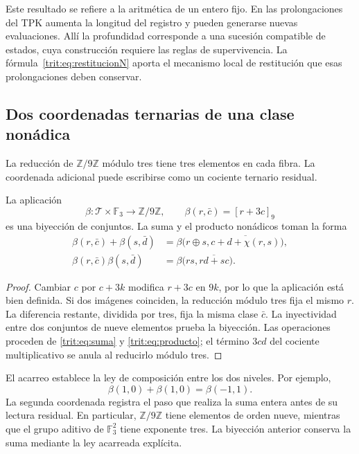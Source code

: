 Este resultado se refiere a la aritmética de un entero fijo. En las
prolongaciones del TPK aumenta la longitud del registro y pueden generarse
nuevas evaluaciones. Allí la profundidad corresponde a una sucesión
compatible de estados, cuya construcción requiere las reglas de
supervivencia. La fórmula~\eqref{trit:eq:restitucionN} aporta el mecanismo
local de restitución que esas prolongaciones deben conservar.

\subsection{Dos coordenadas ternarias de una clase nonádica}
\label{trit:nonadico}

La reducción de \(\mathbb Z/9\mathbb Z\) módulo tres tiene tres elementos
en cada fibra. La coordenada adicional puede escribirse como un cociente
ternario residual.

\begin{proposicion}
\label{trit:prop:beta}
La aplicación
\[
 \beta:\mathcal T\times\mathbb F_3\longrightarrow\mathbb Z/9\mathbb Z,
 \qquad \beta(r,\bar c)=[r+3c]_9
\]
es una biyección de conjuntos. La suma y el producto nonádicos toman la
forma
\begin{align}
 \beta(r,\bar c)+\beta(s,\bar d)
 &=\beta\bigl(r\oplus s,\overline{c+d+\chi(r,s)}\bigr),
 \label{trit:eq:beta-suma}\\
 \beta(r,\bar c)\beta(s,\bar d)
 &=\beta\bigl(rs,\overline{rd+sc}\bigr).
 \label{trit:eq:beta-producto}
\end{align}
\end{proposicion}
\begin{proof}
Cambiar \(c\) por \(c+3k\) modifica \(r+3c\) en \(9k\), por lo que
la aplicación está bien definida. Si dos imágenes coinciden, la reducción
módulo tres fija el mismo \(r\). La diferencia restante, dividida por
tres, fija la misma clase \(\bar c\). La inyectividad entre dos conjuntos
de nueve elementos prueba la biyección. Las operaciones proceden de
\eqref{trit:eq:suma} y \eqref{trit:eq:producto}; el término \(3cd\) del
cociente multiplicativo se anula al reducirlo módulo tres.
\end{proof}

El acarreo establece la ley de composición entre los dos niveles. Por
ejemplo,
\[
 \beta(1,0)+\beta(1,0)=\beta(-1,1).
\]
La segunda coordenada registra el paso que realiza la suma entera antes
de su lectura residual. En particular, \(\mathbb Z/9\mathbb Z\) tiene
elementos de orden nueve, mientras que el grupo aditivo de
\(\mathbb F_3^2\) tiene exponente tres. La biyección anterior conserva
la suma mediante la ley acarreada explícita.

